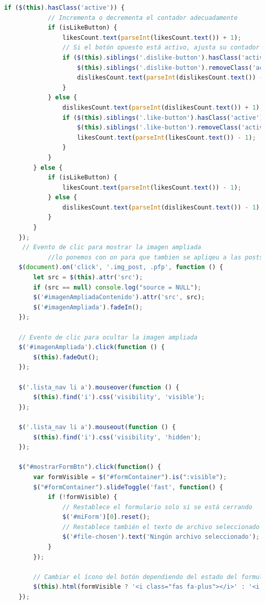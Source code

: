 \documentclass{article}
\begin{document}
\begin{lstlisting}[language=JavaScript, caption=Carga de los comentarios]
        if ($(this).hasClass('active')) {
            // Incrementa o decrementa el contador adecuadamente
            if (isLikeButton) {
                likesCount.text(parseInt(likesCount.text()) + 1);
                // Si el botón opuesto está activo, ajusta su contador también
                if ($(this).siblings('.dislike-button').hasClass('active')) {
                    $(this).siblings('.dislike-button').removeClass('active');
                    dislikesCount.text(parseInt(dislikesCount.text()) - 1);
                }
            } else {
                dislikesCount.text(parseInt(dislikesCount.text()) + 1);
                if ($(this).siblings('.like-button').hasClass('active')) {
                    $(this).siblings('.like-button').removeClass('active');
                    likesCount.text(parseInt(likesCount.text()) - 1);
                }
            }
        } else {
            if (isLikeButton) {
                likesCount.text(parseInt(likesCount.text()) - 1);
            } else {
                dislikesCount.text(parseInt(dislikesCount.text()) - 1);
            }
        }
    });
     // Evento de clic para mostrar la imagen ampliada
            //lo ponemos con on para que tambien se apliqeu a las posts nuevos que introducimos y no solo a los que estan por defecto.
    $(document).on('click', '.img_post, .pfp', function () {
        let src = $(this).attr('src');
        if (src == null) console.log("source = NULL");
        $('#imagenAmpliadaContenido').attr('src', src);
        $('#imagenAmpliada').fadeIn();
    });

    // Evento de clic para ocultar la imagen ampliada
    $('#imagenAmpliada').click(function () {
        $(this).fadeOut();
    });

    $('.lista_nav li a').mouseover(function () {
        $(this).find('i').css('visibility', 'visible');
    });

    $('.lista_nav li a').mouseout(function () {
        $(this).find('i').css('visibility', 'hidden');
    });

    $("#mostrarFormBtn").click(function() {
        var formVisible = $("#formContainer").is(":visible");
        $("#formContainer").slideToggle('fast', function() {
            if (!formVisible) {
                // Restablece el formulario solo si se está cerrando
                $('#miForm')[0].reset();
                // Restablece también el texto de archivo seleccionado
                $('#file-chosen').text('Ningún archivo seleccionado');
            }
        });

        // Cambiar el ícono del botón dependiendo del estado del formulario
        $(this).html(formVisible ? '<i class="fas fa-plus"></i>' : '<i class="fas fa-minus"></i>');
    });
\end{lstlisting}
\end{document}
